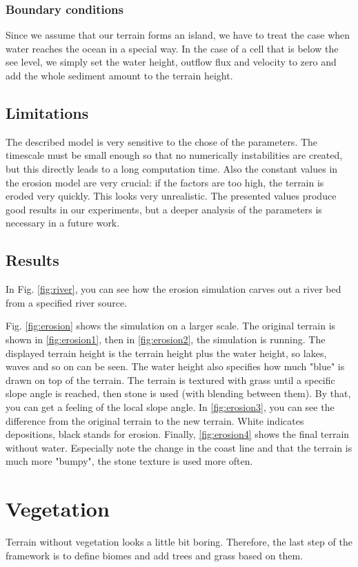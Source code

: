 \documentclass[journal, letterpaper]{IEEEtran}
\begin{document}
\subsubsection{Boundary conditions}
Since we assume that our terrain forms an island, we have to treat the case when water reaches the ocean in a special way.
In the case of a cell that is below the see level, we simply set the water height, outflow flux and velocity to zero and add the whole sediment amount to the terrain height.

\subsection{Limitations}
The described model is very sensitive to the chose of the parameters. The timescale must be small enough so that no numerically instabilities are created, but this directly leads to a long computation time. Also the constant values in the erosion model are very crucial: if the factors are too high, the terrain is eroded very quickly. This looks very unrealistic. The presented values produce good results in our experiments, but a deeper analysis of the parameters is necessary in a future work.

\subsection{Results}
In Fig. \ref{fig:river}, you can see how the erosion simulation carves out a river bed from a specified river source.

Fig. \ref{fig:erosion} shows the simulation on a larger scale. The original terrain is shown in \ref{fig:erosion1}, then in \ref{fig:erosion2}, the simulation is running. The displayed terrain height is the terrain height plus the water height, so lakes, waves and so on can be seen. The water height also specifies how much "blue" is drawn on top of the terrain. The terrain is textured with grass until a specific slope angle is reached, then stone is used (with blending between them). By that, you can get a feeling of the local slope angle. In \ref{fig:erosion3}, you can see the difference from the original terrain to the new terrain. White indicates depositions, black stands for erosion. Finally, \ref{fig:erosion4} shows the final terrain without water. Especially note the change in the coast line and that the terrain is much more "bumpy", the stone texture is used more often.

\section{Vegetation}\label{Vegetation}
Terrain without vegetation looks a little bit boring. Therefore, the last step of the framework is to define biomes and add trees and grass based on them.
\end{document}
